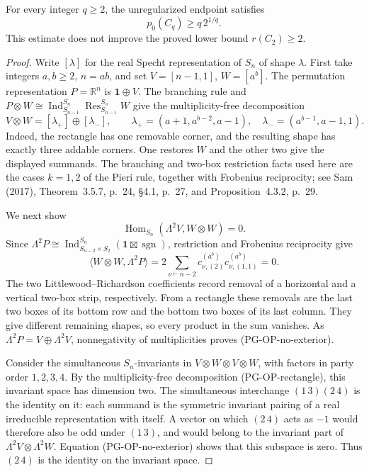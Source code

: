 \begin{proposition}
\label{pg:op-raw-allq}
For every integer $q\geq2$, the unregularized endpoint satisfies
\[
 p_0(C_q)\geq q\,2^{1/q}.
 \tag{PG-OP-raw-allq}
\]
This estimate does not improve the proved lower bound $r(C_2)\geq2$.
\end{proposition}
\begin{proof}
Write $[\lambda]$ for the real Specht representation of $S_n$ of
shape $\lambda$. First take integers $a,b\geq2$, $n=ab$, and set
$V=[n-1,1]$, $W=[a^b]$. The permutation representation
$P=\mathbb R^n$ is $\mathbf1\oplus V$. The branching rule and
$P\otimes W\cong\operatorname{Ind}_{S_{n-1}}^{S_n}
\operatorname{Res}_{S_{n-1}}^{S_n}W$ give the multiplicity-free
decomposition
\[
 V\otimes W=[\lambda_+]\oplus[\lambda_-],\qquad
 \lambda_+=(a+1,a^{b-2},a-1),\quad
 \lambda_-=(a^{b-1},a-1,1).
 \tag{PG-OP-rectangle}
\]
Indeed, the rectangle has one removable corner, and the resulting
shape has exactly three addable corners. One restores $W$ and the
other two give the displayed summands. The branching and two-box
restriction facts used here are the cases $k=1,2$ of the Pieri rule,
together with Frobenius reciprocity; see Sam (2017),
Theorem~3.5.7, p.~24, \S4.1, p.~27, and
Proposition~4.3.2, p.~29.

We next show
\[
 \operatorname{Hom}_{S_n}(\Lambda^2V,W\otimes W)=0.
 \tag{PG-OP-no-exterior}
\]
Since
$\Lambda^2P\cong
\operatorname{Ind}_{S_{n-2}\times S_2}^{S_n}
(\mathbf1\boxtimes\operatorname{sgn})$, restriction and
Frobenius reciprocity give
\[
 \big\langle W\otimes W,\Lambda^2P\big\rangle
 =2\sum_{\nu\vdash n-2}
 c^{(a^b)}_{\nu,(2)}c^{(a^b)}_{\nu,(1,1)}=0.
\]
The two Littlewood--Richardson coefficients record removal of a
horizontal and a vertical two-box strip, respectively. From a
rectangle these removals are the last two boxes of its bottom row
and the bottom two boxes of its last column. They give different
remaining shapes, so every product in the sum vanishes.
As $\Lambda^2P=V\oplus\Lambda^2V$, nonnegativity of
multiplicities proves (PG-OP-no-exterior).

Consider the simultaneous $S_n$-invariants in
$V\otimes W\otimes V\otimes W$, with factors in party order
$1,2,3,4$. By the multiplicity-free decomposition
(PG-OP-rectangle), this invariant space has dimension two.
The simultaneous interchange $(1\,3)(2\,4)$ is the identity on
it: each summand is the symmetric invariant pairing of a real
irreducible representation with itself. A vector on which
$(2\,4)$ acts as $-1$ would therefore also be odd under
$(1\,3)$, and would belong to the invariant part of
$\Lambda^2V\otimes\Lambda^2W$. Equation
(PG-OP-no-exterior) shows that this subspace is zero.
Thus $(2\,4)$ is the identity on the invariant space.


\end{proof}
